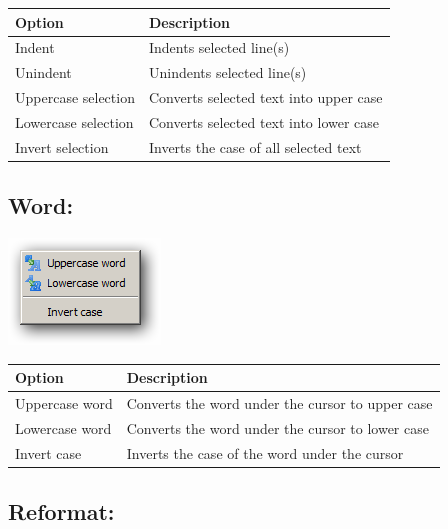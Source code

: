 \begin{scriptsize}\begin{tabularx}{\textwidth}{>{\hsize=0.4\hsize}X>{\hsize=0.6\hsize}X}\\
    \hline
    \textbf{Option} & \textbf{Description} \\
    \hline
    Indent & Indents selected line(s) \\
    Unindent & Unindents selected line(s) \\
    Uppercase selection & Converts selected text into upper case \\
    Lowercase selection & Converts selected text into lower case \\
    Invert selection & Inverts the case of all selected text \\
    \hline
  \end{tabularx}\end{scriptsize}


\hypertarget{menu_format_word}{}
\subsection{Word:}

\includegraphics[scale=0.50]{./res/menu_format_word.png}\\

\begin{scriptsize}\begin{tabularx}{\textwidth}{>{\hsize=0.3\hsize}X>{\hsize=0.7\hsize}X}\\
    \hline
    \textbf{Option} & \textbf{Description} \\
    \hline
    Uppercase word & Converts the word under the cursor to upper case \\
    Lowercase word & Converts the word under the cursor to lower case \\
    Invert case & Inverts the case of the word under the cursor \\
    \hline
  \end{tabularx}\end{scriptsize}

\hypertarget{menu_format_reformat}{}
\subsection{Reformat:}

